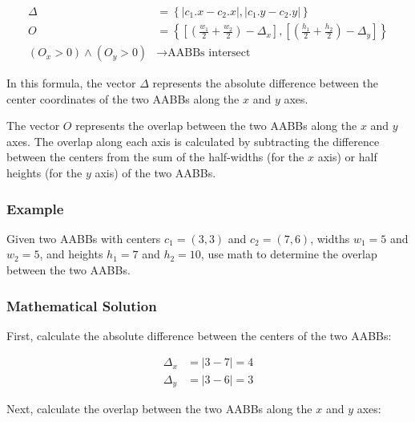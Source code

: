 \begin{equation}
    \begin{aligned}
        \Delta                        & = \left\{ \left| c_1.x - c_2.x \right| , \left| c_1.y - c_2.y \right| \right\}                                                                                     \\
        O                             & = \left\{ \left[ \left( \frac{w_1}{2} + \frac{w_2}{2} \right) - \Delta_x \right] , \left[ \left( \frac{h_1}{2} + \frac{h_2}{2} \right) - \Delta_y \right] \right\} \\
        ( O_x > 0 ) \land ( O_y > 0 ) & \rightarrow \text{AABBs intersect}
    \end{aligned}
\end{equation}

In this formula, the vector $\Delta$ represents the absolute difference between
the center coordinates of the two AABBs along the $x$ and $y$ axes.

The vector $O$ represents the overlap between the two AABBs along the $x$ and
$y$ axes. The overlap along each axis is calculated by subtracting the
difference between the centers from the sum of the half-widths (for the $x$
axis) or half heights (for the $y$ axis) of the two AABBs.

\subsubsection{Example}

Given two AABBs with centers $c_1 = (3, 3)$ and $c_2 = (7, 6)$, widths $w_1 =
    5$ and $w_2 = 5$, and heights $h_1 = 7$ and $h_2 = 10$, use math to determine
the overlap between the two AABBs.

\subsubsection{Mathematical Solution}

First, calculate the absolute difference between the centers of the two AABBs:

\begin{equation*}
    \begin{aligned}
        \Delta_x & = \left| 3 - 7 \right| = 4 \\
        \Delta_y & = \left| 3 - 6 \right| = 3
    \end{aligned}
\end{equation*}

Next, calculate the overlap between the two AABBs along the $x$ and $y$ axes:

